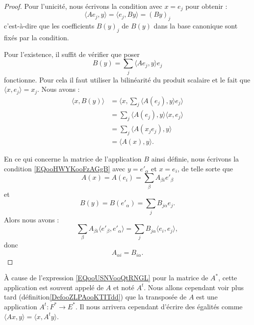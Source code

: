 \begin{proof}
	Pour l'unicité, nous écrivons la condition avec \( x=e_j\) pour obtenir :
	\begin{equation}
		\langle Ae_j, y\rangle = \langle e_j, By\rangle =(By)_j
	\end{equation}
	c'est-à-dire que les coefficients \( B(y)_j\) de \( B(y)\) dans la base canonique sont fixés par la condition.

	Pour l'existence, il suffit de vérifier que poser
	\begin{equation}
		B(y)=\sum_j\langle Ae_j, y\rangle e_j
	\end{equation}
	fonctionne. Pour cela il faut utiliser la bilinéarité du produit scalaire et le fait que \( \langle x, e_j\rangle =x_j\). Nous avons :
	\begin{subequations}
		\begin{align}
			\langle x, B(y)\rangle & =\langle x, \sum_j\langle A(e_j), y\rangle e_j\rangle \\
			                       & =\sum_j\langle A(e_j), y\rangle \langle x, e_j\rangle \\
			                       & =\sum_j\langle A(x_je_j), y\rangle                    \\
			                       & =\langle A(x), y\rangle .
		\end{align}
	\end{subequations}

	En ce qui concerne la matrice de l'application \( B\) ainsi définie, nous écrivons la condition \eqref{EQooHWYKooFzAGgB} avec \( y=e'_{\alpha}\) et \( x=e_i\), de telle sorte que
	\begin{equation}
		A(x)=A(e_i)=\sum_{\beta}A_{\beta i}e'_{\beta}
	\end{equation}
	et
	\begin{equation}
		B(y)=B(e'_{\alpha})=\sum_jB_{j\alpha}e_j.
	\end{equation}
	Alors nous avons :
	\begin{equation}
		\sum_{\beta}A_{\beta i}\langle e'_{\beta}, e'_{\alpha}\rangle =\sum_j B_{j\alpha}\langle e_i, e_j\rangle ,
	\end{equation}
	donc
	\begin{equation}
		A_{\alpha i}=B_{i \alpha}.
	\end{equation}
\end{proof}

\begin{normaltext}
	À cause de l'expression \eqref{EQooUSNVooQtRNGL} pour la matrice de \( A^*\), cette application est souvent appelé  de \( A\) et noté \( A^t\). Nous allons cependant voir plus tard (définition\ref{DefooZLPAooKTITdd}) que la transposée de \( A\) est une application \( A^t\colon F^*\to E^*\). Il nous arrivera cependant d'écrire des égalités comme \( \langle Ax, y\rangle=\langle x, A^ty\rangle  \).
\end{normaltext}

